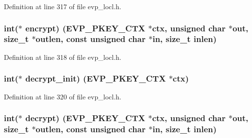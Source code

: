 Definition at line 317 of file evp\+\_\+locl.\+h.

\subsubsection[{\texorpdfstring{encrypt}{encrypt}}]{\setlength{\rightskip}{0pt plus 5cm}int($\ast$ encrypt) ({\bf E\+V\+P\+\_\+\+P\+K\+E\+Y\+\_\+\+C\+TX} $\ast$ctx, unsigned char $\ast$out, size\+\_\+t $\ast$outlen, const unsigned char $\ast$in, size\+\_\+t inlen)}\hypertarget{structevp__pkey__method__st_a6f2eaf55e856641d4757261bc0750275}{}\label{structevp__pkey__method__st_a6f2eaf55e856641d4757261bc0750275}


Definition at line 318 of file evp\+\_\+locl.\+h.

\subsubsection[{\texorpdfstring{decrypt\+\_\+init}{decrypt_init}}]{\setlength{\rightskip}{0pt plus 5cm}int($\ast$ decrypt\+\_\+init) ({\bf E\+V\+P\+\_\+\+P\+K\+E\+Y\+\_\+\+C\+TX} $\ast$ctx)}\hypertarget{structevp__pkey__method__st_a53fd999bdc6431dda7ad8c465600aec2}{}\label{structevp__pkey__method__st_a53fd999bdc6431dda7ad8c465600aec2}


Definition at line 320 of file evp\+\_\+locl.\+h.

\subsubsection[{\texorpdfstring{decrypt}{decrypt}}]{\setlength{\rightskip}{0pt plus 5cm}int($\ast$ decrypt) ({\bf E\+V\+P\+\_\+\+P\+K\+E\+Y\+\_\+\+C\+TX} $\ast$ctx, unsigned char $\ast$out, size\+\_\+t $\ast$outlen, const unsigned char $\ast$in, size\+\_\+t inlen)}\hypertarget{structevp__pkey__method__st_a7977b5b3c000c93ae4405b503061228f}{}\label{structevp__pkey__method__st_a7977b5b3c000c93ae4405b503061228f}


